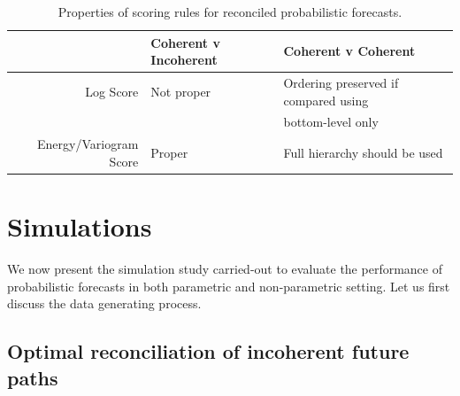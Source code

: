 \documentclass[12pt]{article}
\theoremstyle{definition}
\begin{document}
\begin{table}
	\caption{Properties of scoring rules for reconciled probabilistic forecasts.}
	\centering
	\begin{tabular}{rll}
		& Coherent v Incoherent &Coherent v Coherent\\
		\hline
		Log Score & Not proper & Ordering preserved if compared using\\ &&bottom-level only\\
		Energy/Variogram Score & Proper & Full hierarchy should be used\\
		\hline
	\end{tabular}
	
	\label{tab:prop}
\end{table}

\section{Simulations}

We now present the simulation study carried-out to evaluate the performance of probabilistic forecasts in both parametric and non-parametric setting. Let us first discuss the data generating process.

\subsection{Optimal reconciliation of incoherent future paths}\label{subsec:Optimal_recon}
\end{document}
